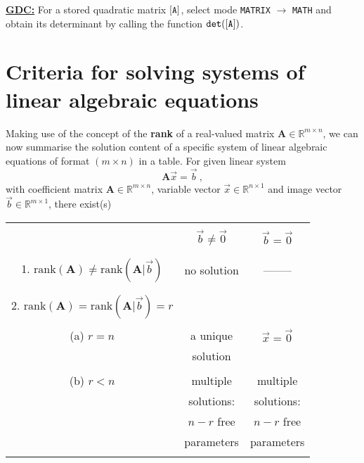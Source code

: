 \medskip
\noindent
\underline {\bf GDC:} For a stored quadratic matrix ${\tt [A]}$, 
select mode {\tt MATRIX} $\rightarrow$ {\tt MATH} and obtain its 
determinant by calling the function ${\tt det([A])}$.

\section[Solution criteria]%
{Criteria for solving systems of linear algebraic equations}
Making use of the concept of the {\bf rank} of a real-valued 
matrix $\mathbf{A} \in \mathbb{R}^{m \times n}$, we can now 
summarise the solution content of a specific system of linear 
algebraic equations of format $(m \times n)$ in a table. For given 
linear system
%
$$
\mathbf{A}\vec{x} = \vec{b} \ ,
$$
%
with coefficient matrix $\mathbf{A} \in \mathbb{R}^{m \times n}$, 
variable vector $\vec{x} \in \mathbb{R}^{n \times 1}$ and image 
vector $\vec{b} \in \mathbb{R}^{m \times 1}$,
there exist(s)
%
\begin{center}
	\begin{tabular}[h]{c|c|c}
		\hline\hline
		 & & \\
		 & $\vec{b} \neq \vec{0}$ &
		 $\vec{b} = \vec{0}$ \\
		 & & \\
		\hline
		 & & \\
		1. $\text{rank}(\mathbf{A}) \neq \text{rank}(\mathbf{A}|\vec{b})$ &
		no solution & -------- \\
		 & & \\
		\hline
		 & & \\
		2. $\text{rank}(\mathbf{A}) = \text{rank}(\mathbf{A}|\vec{b}) = r$ &
		& \\
		 & & \\
		(a) \quad $r = n$ & a unique & $\vec{x} = \vec{0}$ \\
		 & solution & \\
		 & & \\
		(b) \quad $r < n$ & multiple & multiple \\
		 & solutions: & solutions: \\
		 & $n-r$ free &  $n-r$ free \\
		 & parameters & parameters \\
		 & & \\
		\hline\hline
	 \end{tabular}
\end{center}
%

